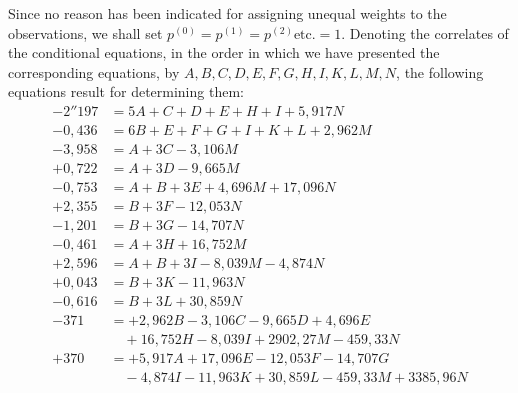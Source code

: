Since no reason has been indicated for assigning unequal weights to the observations, we shall set \(p^{(0)}=p^{(1)}=p^{(2)}\text{etc.}=1\). Denoting the correlates of the conditional equations, in the order in which we have presented the corresponding equations, by \(A,\allowbreak B,\allowbreak C,\allowbreak D,\allowbreak E,\allowbreak F,\allowbreak G,\allowbreak H,\allowbreak I,\allowbreak K,\allowbreak L,\allowbreak M,\allowbreak N\), the following equations result for determining them:
\[
\begin{aligned}
-2''197&=5A+C+D+E+H+I+5{,}917N\\
-0{,}436&=6B+E+F+G+I+K+L+2{,}962M\\
-3{,}958&=A+3C-3{,}106M\\
+0{,}722&=A+3D-9{,}665M\\
-0{,}753&=A+B+3E+4{,}696M+17{,}096N\\
+2{,}355&=B+3F-12{,}053N\\
-1{,}201&=B+3G-14{,}707N\\
-0{,}461&=A+3H+16{,}752M\\
+2{,}596&=A+B+3I-8{,}039M-4{,}874N\\
+0{,}043&=B+3K-11{,}963N\\
-0{,}616&=B+3L+30{,}859N\\
-371&=+2{,}962B-3{,}106C-9{,}665D+4{,}696E\\
&\quad+16{,}752H-8{,}039I+2902{,}27M-459{,}33N\\
+370&=+5{,}917A+17{,}096E-12{,}053F-14{,}707G\\
&\quad-4{,}874I-11{,}963K+30{,}859L-459{,}33M+3385{,}96N
\end{aligned}
\]

